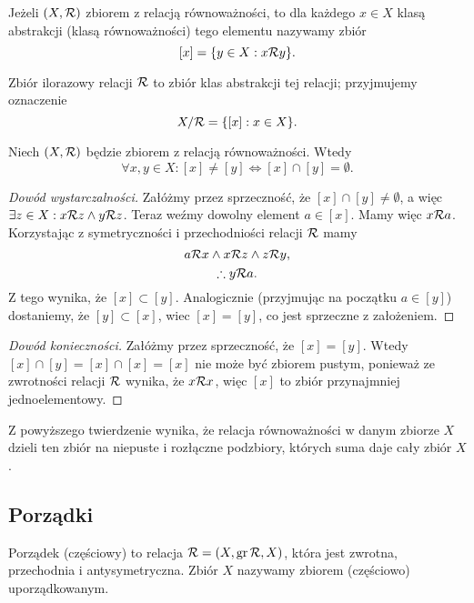 \documentclass[11pt]{scrartcl}
\begin{document}
    \begin{definition}
        Jeżeli $(X, \mathcal R)$ zbiorem z relacją równoważności, to dla każdego $x \in X$ klasą abstrakcji (klasą równoważności) tego elementu nazywamy zbiór
        $$ [x] = \{y \in X : x \mathcal R y\}. $$
    \end{definition}

    \begin{definition}
        Zbiór ilorazowy relacji $\mathcal R$ to zbiór klas abstrakcji tej relacji; przyjmujemy oznaczenie
        $$ X/\mathcal R = \{[x] : x \in X\}. $$
    \end{definition}

    \begin{theorem}
        Niech $(X, \mathcal R)$ będzie zbiorem z relacją równoważności. Wtedy
        $$ \forall x, y \in X : [x] \neq [y] \iff [x] \cap [y] = \emptyset . $$
    \end{theorem}
    \begin{proof}[Dowód wystarczalności]\renewcommand{\qedsymbol}{}
        Załóżmy przez sprzeczność, że $[x] \cap [y] \neq \emptyset$, a więc $\exists z \in X : x \mathcal R z \wedge y \mathcal R z$. Teraz weźmy dowolny element $a \in [x]$. Mamy więc $x \mathcal R a$. Korzystając z symetryczności i przechodniości relacji $\mathcal R$ mamy
        $$ a \mathcal R x \wedge x \mathcal R z \wedge z \mathcal R y, $$
        $$ \therefore y \mathcal R a. $$
        Z tego wynika, że $[x] \subset [y]$. Analogicznie (przyjmując na początku $a \in [y]$) dostaniemy, że $[y] \subset [x]$, wiec $[x] = [y]$, co jest sprzeczne z założeniem.
    \end{proof}
    \begin{proof}[Dowód konieczności]
        Załóżmy przez sprzeczność, że $[x] = [y]$. Wtedy $[x] \cap [y] = [x] \cap [x] = [x]$ nie może być zbiorem pustym, ponieważ ze zwrotności relacji $\mathcal R$ wynika, że $x \mathcal R x$, więc $[x]$ to zbiór przynajmniej jednoelementowy.
    \end{proof}

    Z powyższego twierdzenie wynika, że relacja równoważności w danym zbiorze $X$ dzieli ten zbiór na niepuste i rozłączne podzbiory, których suma daje cały zbiór $X$.

    \subsection{Porządki}
    \begin{definition}
        Porządek (częściowy) to relacja $\mathcal R = (X, \operatorname{gr}\mathcal R, X)$, która jest zwrotna, przechodnia i antysymetryczna. Zbiór $X$ nazywamy zbiorem (częściowo) uporządkowanym.
    \end{definition}
\end{document}
